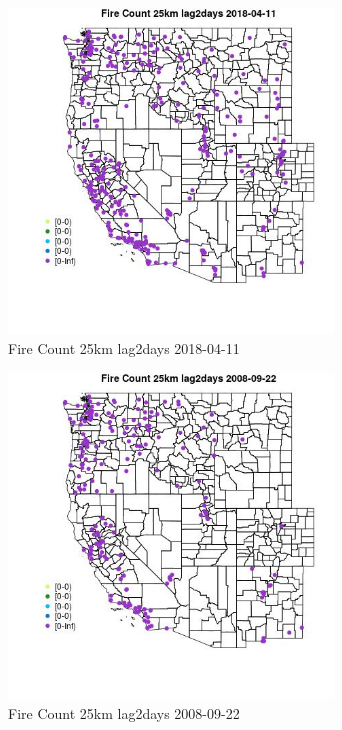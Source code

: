 \begin{figure} 
\centering  
\includegraphics[width=0.77\textwidth]{Code_Outputs/Report_ML_input_PM25_Step4_part_e_de_duplicated_aves_compiled_2019-05-18wNAs_MapObsFire_Count_25km_lag2days2018-04-11.jpg} 
\caption{\label{fig:Report_ML_input_PM25_Step4_part_e_de_duplicated_aves_compiled_2019-05-18wNAsMapObsFire_Count_25km_lag2days2018-04-11}Fire Count 25km lag2days 2018-04-11} 
\end{figure} 
 

\clearpage 

\begin{figure} 
\centering  
\includegraphics[width=0.77\textwidth]{Code_Outputs/Report_ML_input_PM25_Step4_part_e_de_duplicated_aves_compiled_2019-05-18wNAs_MapObsFire_Count_25km_lag2days2008-09-22.jpg} 
\caption{\label{fig:Report_ML_input_PM25_Step4_part_e_de_duplicated_aves_compiled_2019-05-18wNAsMapObsFire_Count_25km_lag2days2008-09-22}Fire Count 25km lag2days 2008-09-22} 
\end{figure} 
 

